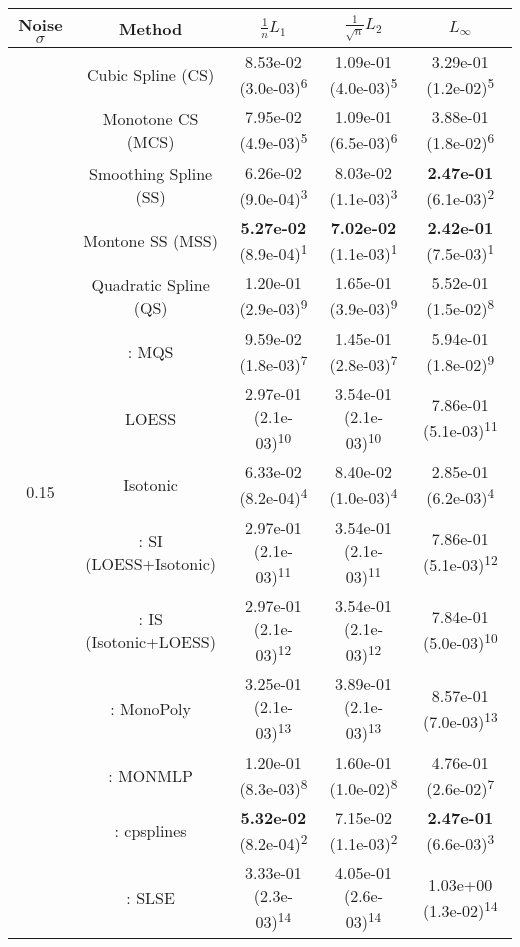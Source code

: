 \begin{tabular}{ccccc}
\toprule
Noise $\sigma$ & Method&$\frac 1n L_1$&$\frac{1}{\sqrt n}L_2$&$L_\infty$\tabularnewline
\midrule
\multirow{14}{*}{0.15}&Cubic Spline (CS)& 8.53e-02 (3.0e-03)\textsuperscript{6}& 1.09e-01 (4.0e-03)\textsuperscript{5}& 3.29e-01 (1.2e-02)\textsuperscript{5}\tabularnewline
&Monotone CS (MCS)& 7.95e-02 (4.9e-03)\textsuperscript{5}& 1.09e-01 (6.5e-03)\textsuperscript{6}& 3.88e-01 (1.8e-02)\textsuperscript{6}\tabularnewline
&Smoothing Spline (SS)& 6.26e-02 (9.0e-04)\textsuperscript{3}& 8.03e-02 (1.1e-03)\textsuperscript{3}& \textbf{2.47e-01} (6.1e-03)\textsuperscript{2}\tabularnewline
&Montone SS (MSS)& \textbf{5.27e-02} (8.9e-04)\textsuperscript{1}& \textbf{7.02e-02} (1.1e-03)\textsuperscript{1}& \textbf{2.42e-01} (7.5e-03)\textsuperscript{1}\tabularnewline
&Quadratic Spline (QS)& 1.20e-01 (2.9e-03)\textsuperscript{9}& 1.65e-01 (3.9e-03)\textsuperscript{9}& 5.52e-01 (1.5e-02)\textsuperscript{8}\tabularnewline
&\textcite{heMonotoneBsplineSmoothing1998}: MQS& 9.59e-02 (1.8e-03)\textsuperscript{7}& 1.45e-01 (2.8e-03)\textsuperscript{7}& 5.94e-01 (1.8e-02)\textsuperscript{9}\tabularnewline
&LOESS& 2.97e-01 (2.1e-03)\textsuperscript{10}& 3.54e-01 (2.1e-03)\textsuperscript{10}& 7.86e-01 (5.1e-03)\textsuperscript{11}\tabularnewline
&Isotonic& 6.33e-02 (8.2e-04)\textsuperscript{4}& 8.40e-02 (1.0e-03)\textsuperscript{4}& 2.85e-01 (6.2e-03)\textsuperscript{4}\tabularnewline
&\textcite{mammenEstimatingSmoothMonotone1991}: SI (LOESS+Isotonic)& 2.97e-01 (2.1e-03)\textsuperscript{11}& 3.54e-01 (2.1e-03)\textsuperscript{11}& 7.86e-01 (5.1e-03)\textsuperscript{12}\tabularnewline
&\textcite{mammenEstimatingSmoothMonotone1991}: IS (Isotonic+LOESS)& 2.97e-01 (2.1e-03)\textsuperscript{12}& 3.54e-01 (2.1e-03)\textsuperscript{12}& 7.84e-01 (5.0e-03)\textsuperscript{10}\tabularnewline
&\textcite{murrayFastFlexibleMethods2016a}: MonoPoly& 3.25e-01 (2.1e-03)\textsuperscript{13}& 3.89e-01 (2.1e-03)\textsuperscript{13}& 8.57e-01 (7.0e-03)\textsuperscript{13}\tabularnewline
&\textcite{cannonMonmlpMultilayerPerceptron2017}: MONMLP& 1.20e-01 (8.3e-03)\textsuperscript{8}& 1.60e-01 (1.0e-02)\textsuperscript{8}& 4.76e-01 (2.6e-02)\textsuperscript{7}\tabularnewline
&\textcite{navarro-garciaConstrainedSmoothingOutofrange2023}: cpsplines& \textbf{5.32e-02} (8.2e-04)\textsuperscript{2}& 7.15e-02 (1.1e-03)\textsuperscript{2}& \textbf{2.47e-01} (6.6e-03)\textsuperscript{3}\tabularnewline
&\textcite{groeneboomConfidenceIntervalsMonotone2023}: SLSE& 3.33e-01 (2.3e-03)\textsuperscript{14}& 4.05e-01 (2.6e-03)\textsuperscript{14}& 1.03e+00 (1.3e-02)\textsuperscript{14}\tabularnewline

\end{tabular}
